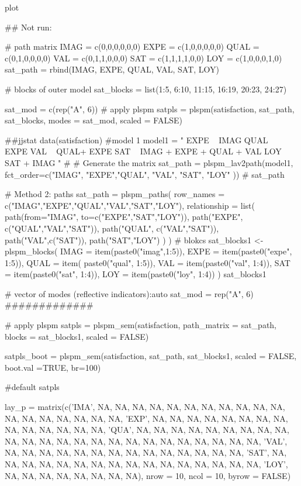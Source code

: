 \documentclass[a4paper]{book}
\begin{document}
\begin{Value}
plot
\end{Value}
%
\begin{Examples}
\begin{ExampleCode}
## Not run: 

# path matrix
IMAG = c(0,0,0,0,0,0)
EXPE = c(1,0,0,0,0,0)
QUAL = c(0,1,0,0,0,0)
VAL = c(0,1,1,0,0,0)
SAT = c(1,1,1,1,0,0)
LOY = c(1,0,0,0,1,0)
sat_path = rbind(IMAG, EXPE, QUAL, VAL, SAT, LOY)

# blocks of outer model
sat_blocks = list(1:5, 6:10, 11:15, 16:19, 20:23, 24:27)

sat_mod = c(rep("A", 6))
# apply plspm
satpls = plspm(satisfaction, sat_path, sat_blocks, modes = sat_mod,
               scaled = FALSE)


 ##jjstat
data(satisfaction)
#model 1
model1 = "
EXPE ~ IMAG
QUAL ~ EXPE
VAL ~  QUAL+ EXPE
SAT ~ IMAG + EXPE + QUAL + VAL
LOY ~ SAT + IMAG
"
# # Generate the matrix
sat_path = plspm_lav2path(model1,
                          fct_order=c("IMAG", "EXPE","QUAL", "VAL", "SAT", "LOY" ))
# sat_path

# Method 2: paths
sat_path = plspm_paths(
  row_names = c("IMAG","EXPE","QUAL","VAL","SAT","LOY"),
  relationship = list(
    path(from="IMAG", to=c("EXPE","SAT","LOY")),
    path("EXPE", c("QUAL","VAL","SAT")),
    path("QUAL", c("VAL","SAT")),
    path("VAL",c("SAT")),
    path("SAT","LOY")
  )
)
# blokcs
sat_blocks1 <- plspm_blocks(
  IMAG = item(paste0("imag",1:5)),
  EXPE = item(paste0("expe", 1:5)),
  QUAL = item( paste0("qual", 1:5)),
  VAL = item(paste0("val", 1:4)),
  SAT = item(paste0("sat", 1:4)),
  LOY = item(paste0("loy", 1:4))
)
sat_blocks1

# vector of modes (reflective indicators):auto
sat_mod = rep("A", 6)
#############

# apply plspm
satpls = plspm_sem(satisfaction,
                   path_matrix = sat_path,
                   blocks = sat_blocks1,
                   scaled = FALSE)

satpls_boot = plspm_sem(satisfaction, sat_path, sat_blocks1, scaled = FALSE,
                        boot.val =TRUE, br=100)

#default
satpls %



lay_p = matrix(c('IMA', NA, NA, NA, NA, NA, NA,
 NA, NA, NA, NA, NA, NA, NA, NA, NA, NA, NA, NA,
 'EXP', NA, NA, NA, NA, NA, NA, NA, NA, NA, NA,
 NA, NA, NA, NA, 'QUA', NA, NA, NA, NA, NA, NA,
 NA, NA, NA, NA, NA, NA, NA, NA, NA, NA, NA, NA,
 NA, NA, NA, NA, NA, NA, 'VAL', NA, NA, NA, NA,
 NA, NA, NA, NA, NA, NA, NA, NA, NA, NA, 'SAT',
 NA, NA, NA, NA, NA, NA, NA, NA, NA, NA, NA, NA,
 NA, NA, NA, NA, 'LOY', NA, NA, NA, NA, NA, NA, NA, NA),
 nrow = 10, ncol = 10, byrow = FALSE)


\end{ExampleCode}
\end{Examples}
\end{document}
